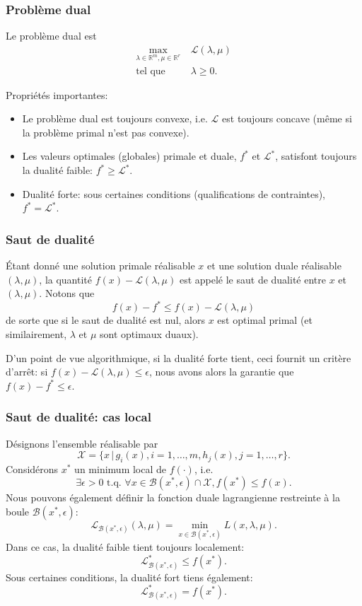 \documentclass[usepdftitle=false]{beamer}
\def\blue{\color{blue}}
\def\cB{\mathcal{B}}
\def\cL{\mathcal{L}}
\def\cX{\mathcal{X}}
\def\RR{\mathbb{R}}
\begin{document}
\begin{frame}
\frametitle{Problème dual}

Le problème dual est
\begin{align*}
\max_{\lambda \in \RR^m, \mu \in \RR^r}\ & \cL(\lambda, \mu) \\
\mbox{tel que } & \lambda \geq 0.
\end{align*}

Propriétés importantes:
\begin{itemize}
\item
Le problème dual est toujours convexe, i.e. $\cL$ est toujours concave (même si la problème primal n'est pas convexe).
\item
Les valeurs optimales (globales) primale et duale, $f^*$ et $\cL^*$, satisfont toujours la dualité faible: $f^* \geq \cL^*$.
\item {\blue Dualité forte}: sous certaines conditions (qualifications de contraintes), $f^* = \cL^*$.
\end{itemize}

\end{frame}

\begin{frame}
\frametitle{Saut de dualité}

Étant donné une solution primale réalisable $x$ et une solution duale réalisable $(\lambda, \mu)$, la quantité $f(x) - \cL(\lambda, \mu)$ est appelé le saut de dualité entre $x$ et $(\lambda, \mu)$.
Notons que
$$
f(x) - f^* \leq f(x) - \cL(\lambda, \mu)
$$
de sorte que si le saut de dualité est nul, alors $x$ est optimal primal (et similairement, $\lambda$ et $\mu$ sont optimaux duaux).

\mbox{}

D'un point de vue algorithmique, si la dualité forte tient, ceci fournit un critère d'arrêt: si $f(x) - \cL(\lambda, \mu) \leq \epsilon$, nous avons alors la garantie que $f(x) - f^* \leq \epsilon$.

\end{frame}

\begin{frame}
\frametitle{Saut de dualité: cas local}

Désignons l'ensemble réalisable par
$$
\cX = \{ x \,|\, g_i(x), i = 1,\ldots,m, h_j(x), j = 1,\ldots,r \}.
$$
Considérons $x^*$ un minimum local de $f(\cdot)$, i.e.
$$
\exists \epsilon > 0  \text{ t.q. } \forall x \in \cB(x^*, \epsilon) \cap \cX, f(x^*) \leq f(x).
$$
Nous pouvons également définir la fonction duale lagrangienne restreinte à la boule $\cB(x^*, \epsilon)$:
$$
\cL_{\cB(x^*, \epsilon)}(\lambda, \mu) = \min_{x \in \cB(x^*, \epsilon)} L(x,\lambda, \mu).
$$
Dans ce cas, la dualité faible tient toujours localement:
$$
\cL^*_{\cB(x^*, \epsilon)} \leq f(x^*).
$$
Sous certaines conditions, la dualité fort tiens également:
$$
\cL^*_{\cB(x^*, \epsilon)} = f(x^*).
$$

\end{frame}
\end{document}
